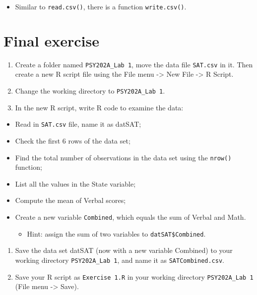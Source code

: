 \documentclass[
]{book}
\providecommand{\tightlist}{%
  \setlength{\itemsep}{0pt}\setlength{\parskip}{0pt}}
\begin{document}
\begin{itemize}
\tightlist
\item
  Similar to \texttt{read.csv()}, there is a function \texttt{write.csv()}.
\end{itemize}

\section{Final exercise}\label{final-exercise}

\begin{enumerate}
\def\labelenumi{\arabic{enumi}.}
\tightlist
\item
  Create a folder named \texttt{PSY202A\_Lab\ 1}, move the data file \texttt{SAT.csv} in it. Then create a new R script file using the File menu -\textgreater{} New File -\textgreater{} R Script.
\item
  Change the working directory to \texttt{PSY202A\_Lab\ 1}.
\item
  In the new R script, write R code to examine the data:
\end{enumerate}

\begin{itemize}
\tightlist
\item
  Read in \texttt{SAT.csv} file, name it as datSAT;
\item
  Check the first 6 rows of the data set;
\item
  Find the total number of observations in the data set using the \texttt{nrow()} function;
\item
  List all the values in the State variable;
\item
  Compute the mean of Verbal scores;
\item
  Create a new variable \texttt{Combined}, which equals the sum of Verbal and Math.

  \begin{itemize}
  \tightlist
  \item
    Hint: assign the sum of two variables to \texttt{datSAT\$Combined}.
  \end{itemize}
\end{itemize}

\begin{enumerate}
\def\labelenumi{\arabic{enumi}.}
\setcounter{enumi}{3}
\tightlist
\item
  Save the data set datSAT (now with a new variable Combined) to your working directory \texttt{PSY202A\_Lab\ 1}, and name it as \texttt{SATCombined.csv}.
\item
  Save your R script as \texttt{Exercise\ 1.R} in your working directory \texttt{PSY202A\_Lab\ 1} (File menu -\textgreater{} Save).
\end{enumerate}
\end{document}
